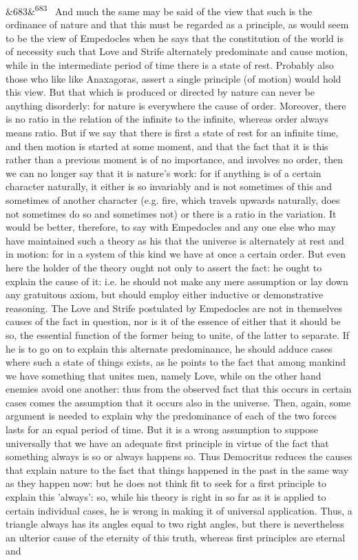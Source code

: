 \documentclass[12pt]{article}
\newcommand{\para}[1][]{\par\noindent\ifx&#1&\else\textsuperscript{\footnotesize #1}~\fi}
\begin{document}
\para[683] And much the same may be said of the view that such is the ordinance of nature and that this must be regarded as a principle, as would seem to be the view of Empedocles when he says that the constitution of the world is of necessity such that Love and Strife alternately predominate and cause motion, while in the intermediate period of time there is a state of rest. Probably also those who like like Anaxagoras, assert a single principle (of motion) would hold this view. But that which is produced or directed by nature can never be anything disorderly: for nature is everywhere the cause of order. Moreover, there is no ratio in the relation of the infinite to the infinite, whereas order always means ratio. But if we say that there is first a state of rest for an infinite time, and then motion is started at some moment, and that the fact that it is this rather than a previous moment is of no importance, and involves no order, then we can no longer say that it is nature's work: for if anything is of a certain character naturally, it either is so invariably and is not sometimes of this and sometimes of another character (e.g. fire, which travels upwards naturally, does not sometimes do so and sometimes not) or there is a ratio in the variation. It would be better, therefore, to say with Empedocles and any one else who may have maintained such a theory as his that the universe is alternately at rest and in motion: for in a system of this kind we have at once a certain order. But even here the holder of the theory ought not only to assert the fact: he ought to explain the cause of it: i.e. he should not make any mere assumption or lay down any gratuitous axiom, but should employ either inductive or demonstrative reasoning. The Love and Strife postulated by Empedocles are not in themselves causes of the fact in question, nor is it of the essence of either that it should be so, the essential function of the former being to unite, of the latter to separate. If he is to go on to explain this alternate predominance, he should adduce cases where such a state of things exists, as he points to the fact that among mankind we have something that unites men, namely Love, while on the other hand enemies avoid one another: thus from the observed fact that this occurs in certain cases comes the assumption that it occurs also in the universe. Then, again, some argument is needed to explain why the predominance of each of the two forces lasts for an equal period of time. But it is a wrong assumption to suppose universally that we have an adequate first principle in virtue of the fact that something always is so or always happens so. Thus Democritus reduces the causes that explain nature to the fact that things happened in the past in the same way as they happen now: but he does not think fit to seek for a first principle to explain this 'always': so, while his theory is right in so far as it is applied to certain individual cases, he is wrong in making it of universal application. Thus, a triangle always has its angles equal to two right angles, but there is nevertheless an ulterior cause of the eternity of this truth, whereas first principles are eternal and
\end{document}
